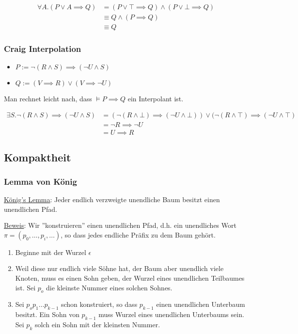 \documentclass{scrartcl}
\begin{document}
\begin{equation}
	\begin{split}
		\forall A.(P \vee A \implies Q) &= (P \vee \top \implies Q) \wedge (P \vee \bot \implies Q) \\
		&\equiv Q \wedge (P \implies Q) \\
		&\equiv Q
	\end{split}
\end{equation}

\subsubsection{Craig Interpolation}

\begin{itemize}
	\item $P := \neg (R \wedge S) \implies (\neg U \wedge S)$
	\item $Q := (V \implies R) \vee (V \implies \neg U)$
\end{itemize}

Man rechnet leicht nach, dass $\models P \implies Q$ ein Interpolant ist.

\begin{equation}
	\begin{split}
		\exists S.\neg (R \wedge S) \implies (\neg U \wedge S) &= (\neg (R \wedge \bot) \implies (\neg U \wedge \bot)) \vee (\neg (R \wedge \top) \implies (\neg U \wedge \top) \\
		&= \neg R \implies \neg U \\
		&= U \implies R
	\end{split}
\end{equation}

\subsection{Kompaktheit}

\subsubsection{Lemma von König}

\underline{König's Lemma}: Jeder endlich verzweigte unendliche Baum besitzt einen unendlichen Pfad. 

\underline{Beweis}: Wir ''konstruieren'' einen unendlichen Pfad, d.h. ein unendliches Wort $\pi = (p_0, \ldots, p_i, \ldots)$, so dass jedes endliche Präfix zu dem Baum gehört.
\begin{enumerate}
	\item Beginne mit der Wurzel $\epsilon$
	\item Weil diese nur endlich viele Söhne hat, der Baum aber unendlich viele Knoten, muss es einen Sohn geben, der Wurzel eines unendlichen Teilbaumes ist. Sei $p_o$ die kleinste Nummer eines solchen Sohnes.
	\item Sei $p_op_1 \ldots p_{k-1}$ schon konstruiert, so dass $p_{k-1}$ einen unendlichen Unterbaum besitzt. Ein Sohn von $p_{k-1}$ muss Wurzel eines unendlichen Unterbaums sein. Sei $p_k$ solch ein Sohn mit der kleinsten Nummer.
\end{enumerate}
\end{document}
